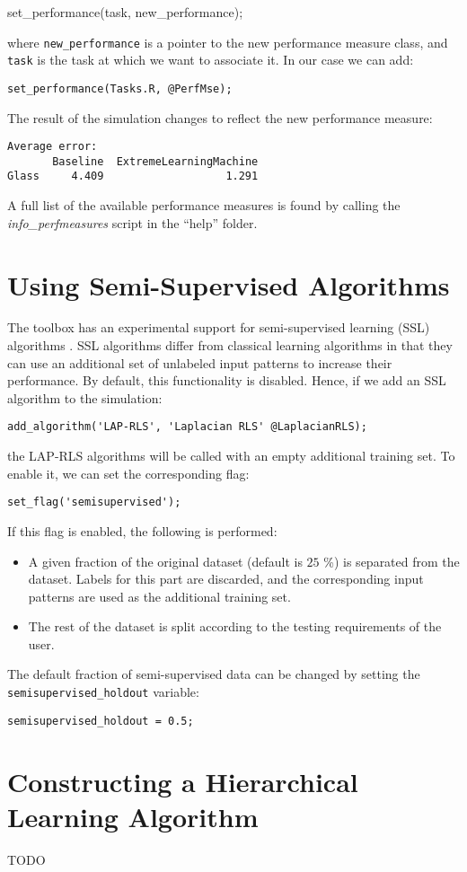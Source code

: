 \begin{console}
set_performance(task, new_performance);
\end{console}

\noindent where \verb|new_performance| is a pointer to the new performance measure class, and \verb|task| is the task at which we want to associate it. In our case we can add:

\begin{lstlisting}
set_performance(Tasks.R, @PerfMse);
\end{lstlisting}

\noindent The result of the simulation changes to reflect the new performance measure:

\begin{verbatim}
Average error:
       Baseline  ExtremeLearningMachine
Glass     4.409                   1.291
\end{verbatim}

\noindent A full list of the available performance measures is found by calling the \textit{info\_perfmeasures} script in the ``help'' folder.

\section{Using Semi-Supervised Algorithms}

The toolbox has an experimental support for semi-supervised learning (SSL) algorithms \cite{chapelle2006semi}. SSL algorithms differ from classical learning algorithms in that they can use an additional set of unlabeled input patterns to increase their performance. By default, this functionality is disabled. Hence, if we add an SSL algorithm to the simulation:

\begin{lstlisting}
add_algorithm('LAP-RLS', 'Laplacian RLS' @LaplacianRLS);
\end{lstlisting}

\noindent the LAP-RLS algorithms will be called with an empty additional training set. To enable it, we can set the corresponding flag:

\begin{lstlisting}
set_flag('semisupervised');
\end{lstlisting}

\noindent If this flag is enabled, the following is performed:

\begin{itemize}
	\item A given fraction of the original dataset (default is $25$ \%) is separated from the dataset. Labels for this part are discarded, and the corresponding input patterns are used as the additional training set.
	\item The rest of the dataset is split according to the testing requirements of the user.
\end{itemize}

The default fraction of semi-supervised data can be changed by setting the \verb|semisupervised_holdout| variable:

\begin{lstlisting}
semisupervised_holdout = 0.5;
\end{lstlisting}

\section{Constructing a Hierarchical Learning Algorithm}

TODO